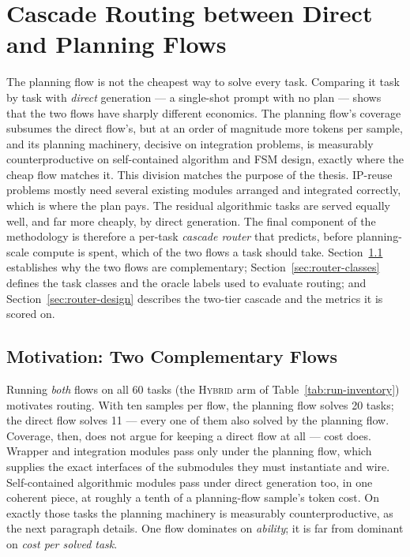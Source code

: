 \section{Cascade Routing between Direct and Planning Flows}
\label{sec:pipeline-routing}

The planning flow is not the cheapest way to solve every task. Comparing it
task by task with \emph{direct} generation --- a single-shot prompt
with no plan --- shows that the two flows have sharply different
economics. The planning flow's coverage subsumes the direct flow's, but at
an order of magnitude more tokens per sample, and its planning
machinery, decisive on integration problems, is measurably
counterproductive on self-contained algorithm and FSM design, exactly
where the cheap flow matches it. This division matches the purpose of
the thesis. IP-reuse problems mostly need several existing modules
arranged and integrated correctly, which is where the plan pays. The
residual algorithmic tasks are served equally well, and far more
cheaply, by direct generation. The final component of the methodology
is therefore a per-task \emph{cascade router} that predicts, before
planning-scale compute is spent, which of the two flows a task should
take. Section~\ref{sec:router-motivation} establishes why the two
flows are complementary; Section~\ref{sec:router-classes} defines the
task classes and the oracle labels used to evaluate routing; and
Section~\ref{sec:router-design} describes the two-tier cascade and the
metrics it is scored on.

\subsection{Motivation: Two Complementary Flows}
\label{sec:router-motivation}

Running \emph{both} flows on all 60 tasks (the \textsc{Hybrid} arm of
Table~\ref{tab:run-inventory}) motivates routing. With ten samples per
flow, the planning flow solves 20 tasks; the direct flow solves 11 ---
every one of them also solved by the planning flow. Coverage,
then, does not argue for keeping a direct flow at all --- cost does.
Wrapper and integration modules pass only under the planning flow, which
supplies the exact interfaces of the submodules they must instantiate
and wire. Self-contained algorithmic modules pass under direct
generation too, in one coherent piece, at roughly a tenth of a planning-flow
sample's token cost. On exactly those tasks the
planning machinery is measurably counterproductive, as the next
paragraph details. One flow dominates on \emph{ability}; it is far from
dominant on \emph{cost per solved task}.


